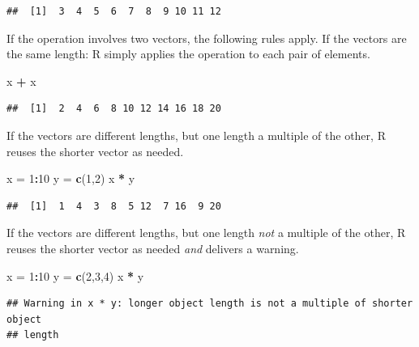 \documentclass[]{article}
\newenvironment{Shaded}{\begin{snugshade}}{\end{snugshade}}
\newcommand{\KeywordTok}[1]{\textcolor[rgb]{0.13,0.29,0.53}{\textbf{#1}}}
\newcommand{\DecValTok}[1]{\textcolor[rgb]{0.00,0.00,0.81}{#1}}
\newcommand{\StringTok}[1]{\textcolor[rgb]{0.31,0.60,0.02}{#1}}
\newcommand{\OperatorTok}[1]{\textcolor[rgb]{0.81,0.36,0.00}{\textbf{#1}}}
\newcommand{\NormalTok}[1]{#1}
\theoremstyle{definition}
\theoremstyle{definition}
\theoremstyle{remark}
\begin{document}
\begin{verbatim}
##  [1]  3  4  5  6  7  8  9 10 11 12
\end{verbatim}

If the operation involves two vectors, the following rules apply. If the
vectors are the same length: R simply applies the operation to each pair
of elements.

\begin{Shaded}
\begin{Highlighting}[]
\NormalTok{x }\OperatorTok{+}\StringTok{ }\NormalTok{x}
\end{Highlighting}
\end{Shaded}

\begin{verbatim}
##  [1]  2  4  6  8 10 12 14 16 18 20
\end{verbatim}

If the vectors are different lengths, but one length a multiple of the
other, R reuses the shorter vector as needed.

\begin{Shaded}
\begin{Highlighting}[]
\NormalTok{x =}\StringTok{ }\DecValTok{1}\OperatorTok{:}\DecValTok{10}
\NormalTok{y =}\StringTok{ }\KeywordTok{c}\NormalTok{(}\DecValTok{1}\NormalTok{,}\DecValTok{2}\NormalTok{)}
\NormalTok{x }\OperatorTok{*}\StringTok{ }\NormalTok{y}
\end{Highlighting}
\end{Shaded}

\begin{verbatim}
##  [1]  1  4  3  8  5 12  7 16  9 20
\end{verbatim}

If the vectors are different lengths, but one length \emph{not} a
multiple of the other, R reuses the shorter vector as needed \emph{and}
delivers a warning.

\begin{Shaded}
\begin{Highlighting}[]
\NormalTok{x =}\StringTok{ }\DecValTok{1}\OperatorTok{:}\DecValTok{10}
\NormalTok{y =}\StringTok{ }\KeywordTok{c}\NormalTok{(}\DecValTok{2}\NormalTok{,}\DecValTok{3}\NormalTok{,}\DecValTok{4}\NormalTok{)}
\NormalTok{x }\OperatorTok{*}\StringTok{ }\NormalTok{y}
\end{Highlighting}
\end{Shaded}

\begin{verbatim}
## Warning in x * y: longer object length is not a multiple of shorter object
## length
\end{verbatim}
\end{document}
